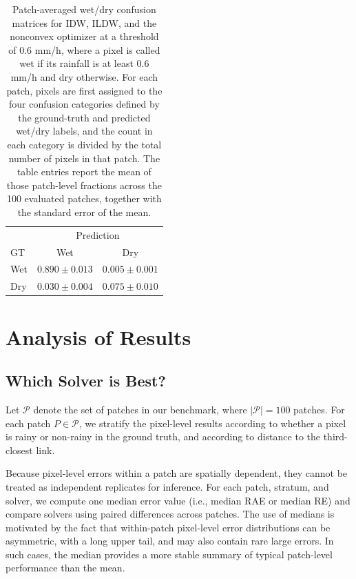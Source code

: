 \documentclass[a4paper,fleqn]{cas-sc}
\begin{document}
\begin{table}[!htbp]
\begin{minipage}[t]{0.31\textwidth}
    \vspace{0.35em}
    \scriptsize
    \begin{tabular}{lcc}
      \toprule
          & \multicolumn{2}{c}{Prediction}                     \\
      GT  & Wet                            & Dry               \\
      \midrule
      Wet & $0.890 \pm 0.013$              & $0.005 \pm 0.001$ \\
      Dry & $0.030 \pm 0.004$              & $0.075 \pm 0.010$ \\
      \bottomrule
    \end{tabular}
  \end{minipage}
  \caption{Patch-averaged wet/dry confusion matrices for IDW, ILDW, and the nonconvex optimizer at a threshold of $0.6$ mm/h, where a pixel is called wet if its rainfall is at least $0.6$ mm/h and dry otherwise. For each patch, pixels are first assigned to the four confusion categories defined by the ground-truth and predicted wet/dry labels, and the count in each category is divided by the total number of pixels in that patch. The table entries report the mean of those patch-level fractions across the 100 evaluated patches, together with the standard error of the mean.}
  \label{tab:confusion_matrices}
\end{table}

\section{Analysis of Results}

\subsection{Which Solver is Best?}
Let $\mathcal{P}$ denote the set of patches in our benchmark, where $|\mathcal{P}|=100$ patches. For each patch $P\in\mathcal{P}$, we stratify the pixel-level results according to whether a pixel is rainy or non-rainy in the ground truth, and according to distance to the third-closest link.

Because pixel-level errors within a patch are spatially dependent, they cannot be treated as independent replicates for inference. For each patch, stratum, and solver, we compute one median error value (i.e., median RAE or median RE) and compare solvers using paired differences across patches. The use of medians is motivated by the fact that within-patch pixel-level error distributions can be asymmetric, with a long upper tail, and may also contain rare large errors. In such cases, the median provides a more stable summary of typical patch-level performance than the mean.
\end{document}
